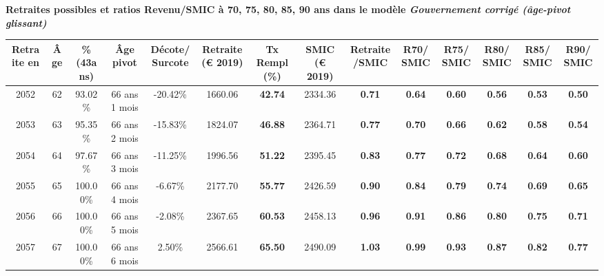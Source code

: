  \vspace{0.1cm} 
{\bf \noindent Retraites possibles et ratios Revenu/SMIC à 70, 75, 80, 85, 90 ans dans le modèle \emph{Gouvernement corrigé (âge-pivot glissant)}}  
 
\begin{adjustbox}{max width=\textwidth} 
\begin{tabular}[htb]{|c|c||c|c|c||c|c||c|c||c|c|c|c|c|} 
\hline 
 Retraite en &  Âge &  \%(43ans) &  Âge pivot &  Décote/Surcote &  Retraite (\euro{} 2019) &  Tx Rempl(\%) &  SMIC (\euro{} 2019) &  Retraite/SMIC &  R70/SMIC &  R75/SMIC &  R80/SMIC &  R85/SMIC &  R90/SMIC \\ 
\hline \hline 
 2052 &  62 &  93.02\% &  66 ans 1 mois &  -20.42\% &  1660.06 &  {\bf 42.74} &  2334.36 &  {\bf {\color{red} 0.71}} &  {\bf {\color{red} 0.64}} &  {\bf {\color{red} 0.60}} &  {\bf {\color{red} 0.56}} &  {\bf {\color{red} 0.53}} &  {\bf {\color{red} 0.50}} \\ 
\hline 
 2053 &  63 &  95.35\% &  66 ans 2 mois &  -15.83\% &  1824.07 &  {\bf 46.88} &  2364.71 &  {\bf {\color{red} 0.77}} &  {\bf {\color{red} 0.70}} &  {\bf {\color{red} 0.66}} &  {\bf {\color{red} 0.62}} &  {\bf {\color{red} 0.58}} &  {\bf {\color{red} 0.54}} \\ 
\hline 
 2054 &  64 &  97.67\% &  66 ans 3 mois &  -11.25\% &  1996.56 &  {\bf 51.22} &  2395.45 &  {\bf {\color{red} 0.83}} &  {\bf {\color{red} 0.77}} &  {\bf {\color{red} 0.72}} &  {\bf {\color{red} 0.68}} &  {\bf {\color{red} 0.64}} &  {\bf {\color{red} 0.60}} \\ 
\hline 
 2055 &  65 &  100.00\% &  66 ans 4 mois &  -6.67\% &  2177.70 &  {\bf 55.77} &  2426.59 &  {\bf {\color{red} 0.90}} &  {\bf {\color{red} 0.84}} &  {\bf {\color{red} 0.79}} &  {\bf {\color{red} 0.74}} &  {\bf {\color{red} 0.69}} &  {\bf {\color{red} 0.65}} \\ 
\hline 
 2056 &  66 &  100.00\% &  66 ans 5 mois &  -2.08\% &  2367.65 &  {\bf 60.53} &  2458.13 &  {\bf {\color{red} 0.96}} &  {\bf {\color{red} 0.91}} &  {\bf {\color{red} 0.86}} &  {\bf {\color{red} 0.80}} &  {\bf {\color{red} 0.75}} &  {\bf {\color{red} 0.71}} \\ 
\hline 
 2057 &  67 &  100.00\% &  66 ans 6 mois &  2.50\% &  2566.61 &  {\bf 65.50} &  2490.09 &  {\bf 1.03} &  {\bf {\color{red} 0.99}} &  {\bf {\color{red} 0.93}} &  {\bf {\color{red} 0.87}} &  {\bf {\color{red} 0.82}} &  {\bf {\color{red} 0.77}} \\ 
\hline 
\hline 
\end{tabular} 
\end{adjustbox} 
 
